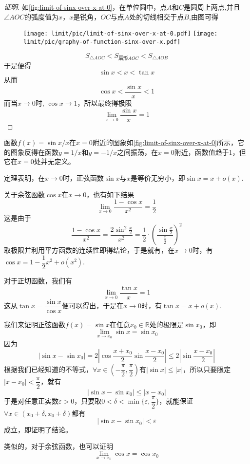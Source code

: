 \begin{proof}[证明]

  如\autoref{fig:limit-of-sinx-over-x-at-0}，在单位圆中，点$A$和$C$是圆周上两点,并且$\angle AOC$的弧度值为$x$，$x$是锐角，$OC$与点$A$处的切线相交于点$B$,由图可得
  
\begin{figure}[htbp]
\centering
\texttt{[image: limit/pic/limit-of-sinx-over-x-at-0.pdf]}
\texttt{[image: limit/pic/graphy-of-function-sinx-over-x.pdf]}
\caption{}
\label{fig:limit-of-sinx-over-x-at-0}
\end{figure}

  \[ S_{\triangle AOC} < S_{\text{扇形}AOC} < S_{\triangle AOB} \]
  于是便得
  \[ \sin{x} < x < \tan{x} \]
  从而
  \[ \cos{x} < \frac{\sin{x}}{x} < 1 \]
  而当$x \to 0$时, $\cos{x} \to 1$，所以最终得极限
  \[ \lim_{x \to 0} \frac{\sin{x}}{x} = 1 \]
\end{proof}

函数$f(x)=\sin{x}/x$在$x=0$附近的图象如\autoref{fig:limit-of-sinx-over-x-at-0}所示，它的图象反得在函数$y=1/x$和$y=-1/x$之间振荡，在$x=0$附近，函数值趋于1，但它在$x=0$处并无定义。

定理表明，在$x \to 0$时，正弦函数$\sin{x}$与$x$是等价无穷小，即$\sin{x}=x+o(x)$.

\begin{example}
  关于余弦函数$\cos{x}$在$x \to 0$，也有如下结果
  \[ \lim_{x \to 0} \frac{1-\cos{x}}{x^2} = \frac{1}{2} \]
  这是由于
    \[ \frac{1-\cos{x}}{x^2} = \frac{2\sin^2 \frac{x}{2}}{x^2} = \frac{1}{2} \cdot \left( \frac{\sin{\frac{x}{2}}}{\frac{x}{2}} \right)^2 \]
    取极限并利用平方函数的连续性即得结论，于是就有，在$x \to 0$时，有$\cos{x}=1-\dfrac{1}{2}x^2+o(x^2)$.
\end{example}

\begin{example}
  对于正切函数，我们有
  \[ \lim_{x \to 0} \frac{\tan{x}}{x} = 1 \]
  这从$\tan{x}=\dfrac{\sin{x}}{\cos{x}}$便可以得出，于是在$x \to 0$时，有$\tan{x} = x + o(x)$.
\end{example}

\begin{example}
  \label{example:limit-of-sin-cos-function}
  我们来证明正弦函数$f(x)=\sin{x}$在任意$x_0 \in \mathbb{R}$处的极限是$\sin{x_0}$，即
  \[ \lim_{x \to x_0} \sin{x} = \sin{x_0} \]
  因为
  \[ |\sin{x}-\sin{x_0}| = 2 \left| \cos{\frac{x+x_0}{2}} \sin{\frac{x-x_0}{2}} \right| \leqslant 2 \left| \sin{\frac{x-x_0}{2}} \right| \]
  根据我们已经知道的不等式，$\forall x \in \left(- \dfrac{\pi}{2}, \dfrac{\pi}{2} \right)$有$|\sin{x}| \leqslant |x|$，所以只要限定$|x-x_0|<\dfrac{\pi}{2}$，就有
  \[ |\sin{x}-\sin{x_0}| \leqslant |x-x_0| \]
  于是对任意正实数$\varepsilon>0$，只要取$0<\delta<\min\{\varepsilon, \dfrac{\pi}{2}\}$，就能保证$\forall x \in ( x_0+\delta,x_0+\delta )$都有
  \[ |\sin{x}-\sin{x_0}| < \varepsilon \]
  成立，即证明了结论。

  类似的，对于余弦函数，也可以证明
  \[ \lim_{x \to x_0} \cos{x} = \cos{x_0} \]
\end{example}

